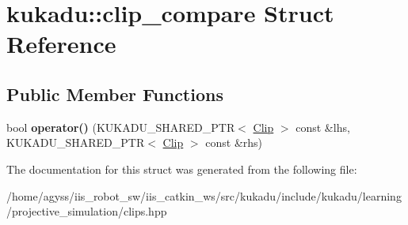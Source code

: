 \hypertarget{structkukadu_1_1clip__compare}{}\section{kukadu\+:\+:clip\+\_\+compare Struct Reference}
\label{structkukadu_1_1clip__compare}
\subsection*{Public Member Functions}
\begin{DoxyCompactItemize}
\item 
bool {\bfseries operator()} (K\+U\+K\+A\+D\+U\+\_\+\+S\+H\+A\+R\+E\+D\+\_\+\+P\+TR$<$ \hyperlink{classkukadu_1_1Clip}{Clip} $>$ const \&lhs, K\+U\+K\+A\+D\+U\+\_\+\+S\+H\+A\+R\+E\+D\+\_\+\+P\+TR$<$ \hyperlink{classkukadu_1_1Clip}{Clip} $>$ const \&rhs)\hypertarget{structkukadu_1_1clip__compare_a00cb7898ad240af31cf9ca301ae7b7ad}{}\label{structkukadu_1_1clip__compare_a00cb7898ad240af31cf9ca301ae7b7ad}

\end{DoxyCompactItemize}


The documentation for this struct was generated from the following file\+:\begin{DoxyCompactItemize}
\item 
/home/agyss/iis\+\_\+robot\+\_\+sw/iis\+\_\+catkin\+\_\+ws/src/kukadu/include/kukadu/learning/projective\+\_\+simulation/clips.\+hpp\end{DoxyCompactItemize}
